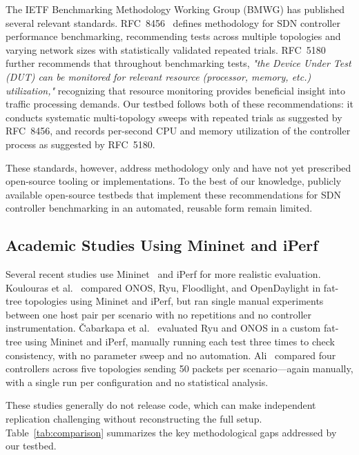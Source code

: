 \documentclass[conference]{IEEEtran}
\begin{document}
The IETF Benchmarking Methodology Working Group (BMWG) has
published several relevant standards. RFC~8456~\cite{rfc8456}
defines methodology for SDN controller performance benchmarking,
recommending tests across multiple topologies and varying network
sizes with statistically validated repeated trials.
RFC~5180~\cite{rfc5180} further recommends that throughout
benchmarking tests, \emph{"the Device Under Test (DUT) can be
monitored for relevant resource (processor, memory, etc.)
utilization,"} recognizing that resource monitoring provides
beneficial insight into traffic processing demands. Our testbed
follows both of these recommendations: it conducts systematic
multi-topology sweeps with repeated trials as suggested by
RFC~8456, and records per-second CPU and memory utilization of
the controller process as suggested by RFC~5180.

These standards, however, address methodology only and have not
yet prescribed open-source tooling or implementations. To the best
of our knowledge, publicly available open-source testbeds that
implement these recommendations for SDN controller benchmarking
in an automated, reusable form remain limited.

\subsection{Academic Studies Using Mininet and iPerf}

Several recent studies use Mininet~\cite{Lantz2010Mininet}
and iPerf for more realistic evaluation.
Koulouras et al.~\cite{Koulouras2022RealWorld} compared
ONOS, Ryu, Floodlight, and OpenDaylight in fat-tree
topologies using Mininet and iPerf, but ran single manual
experiments between one host pair per scenario with no
repetitions and no controller instrumentation.
\v{C}abarkapa et al.~\cite{Cabarkapa2022TreeTopology}
evaluated Ryu and ONOS in a custom fat-tree using Mininet
and iPerf, manually running each test three times to
check consistency, with no parameter sweep and no
automation. Ali~\cite{Ali2024Comparison} compared four
controllers across five topologies sending 50 packets
per scenario---again manually, with a single run per
configuration and no statistical analysis.

These studies generally do not release code, which can make independent
replication challenging without reconstructing the full setup. Table~\ref{tab:comparison}
summarizes the key methodological gaps addressed by our
testbed.
\end{document}

